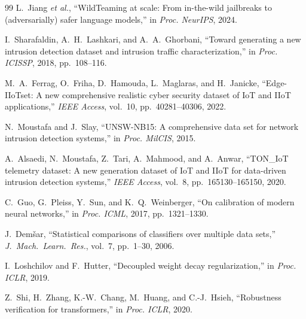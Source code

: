 \documentclass[12pt,a4paper]{article}
\theoremstyle{definition}
\theoremstyle{remark}
\begin{document}
\begin{thebibliography}{99}
L.~Jiang \emph{et al.}, ``{WildTeaming} at scale: From in-the-wild jailbreaks to (adversarially) safer language models,'' in \emph{Proc. NeurIPS}, 2024.

I.~Sharafaldin, A.~H.~Lashkari, and A.~A.~Ghorbani, ``Toward generating a new intrusion detection dataset and intrusion traffic characterization,'' in \emph{Proc. ICISSP}, 2018, pp.~108--116.

M.~A.~Ferrag, O.~Friha, D.~Hamouda, L.~Maglaras, and H.~Janicke, ``{Edge-IIoTset}: A new comprehensive realistic cyber security dataset of IoT and IIoT applications,'' \emph{IEEE Access}, vol.~10, pp.~40281--40306, 2022.

N.~Moustafa and J.~Slay, ``{UNSW-NB15}: A comprehensive data set for network intrusion detection systems,'' in \emph{Proc. MilCIS}, 2015.

A.~Alsaedi, N.~Moustafa, Z.~Tari, A.~Mahmood, and A.~Anwar, ``{TON\_IoT} telemetry dataset: A new generation dataset of IoT and IIoT for data-driven intrusion detection systems,'' \emph{IEEE Access}, vol.~8, pp.~165130--165150, 2020.

C.~Guo, G.~Pleiss, Y.~Sun, and K.~Q.~Weinberger, ``On calibration of modern neural networks,'' in \emph{Proc. ICML}, 2017, pp.~1321--1330.

J.~Dem\v{s}ar, ``Statistical comparisons of classifiers over multiple data sets,'' \emph{J.\ Mach.\ Learn.\ Res.}, vol.~7, pp.~1--30, 2006.

I.~Loshchilov and F.~Hutter, ``Decoupled weight decay regularization,'' in \emph{Proc. ICLR}, 2019.


Z.~Shi, H.~Zhang, K.-W.~Chang, M.~Huang, and C.-J.~Hsieh, ``Robustness verification for transformers,'' in \emph{Proc. ICLR}, 2020.

\end{thebibliography}


\end{document}
